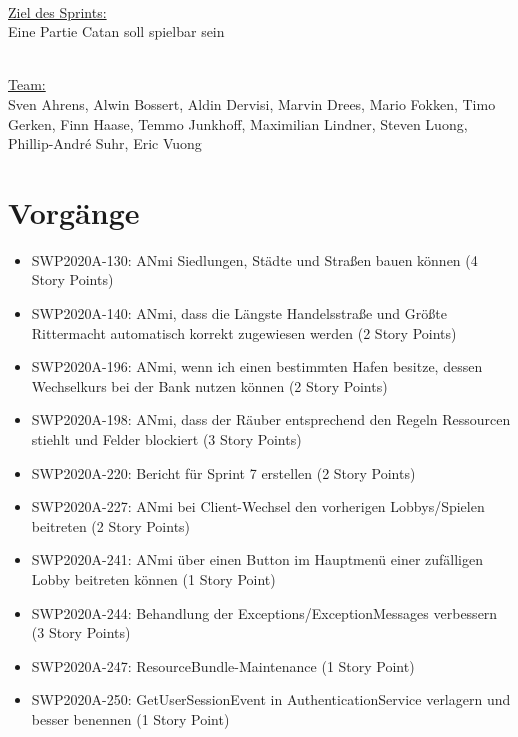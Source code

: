 \documentclass[12pt,a4paper, oneside]{article}
\begin{document}
\noindent 
\\
\underline{Ziel des Sprints:} 
\\
Eine Partie Catan soll spielbar sein

\noindent
\\
\underline {Team:} 
\\
Sven Ahrens, Alwin Bossert, Aldin Dervisi, Marvin Drees, Mario Fokken,
Timo Gerken, Finn Haase, Temmo Junkhoff, Maximilian Lindner, Steven Luong, Phillip-André Suhr, Eric Vuong


\section{Vorgänge}

\begin{itemize}

\item SWP2020A-130: ANmi Siedlungen, Städte und Straßen bauen können (4 Story Points)

\item SWP2020A-140: ANmi, dass die Längste Handelsstraße und Größte Rittermacht automatisch korrekt zugewiesen werden (2 Story Points)

\item SWP2020A-196:	ANmi, wenn ich einen bestimmten Hafen besitze, dessen Wechselkurs bei der Bank nutzen können (2 Story Points)

\item SWP2020A-198:	ANmi, dass der Räuber entsprechend den Regeln Ressourcen stiehlt und Felder blockiert (3 Story Points)

\item SWP2020A-220:	Bericht für Sprint 7 erstellen (2 Story Points)

\item SWP2020A-227:	ANmi bei Client-Wechsel den vorherigen Lobbys/Spielen beitreten (2 Story Points)

\item SWP2020A-241: ANmi über einen Button im Hauptmenü einer zufälligen Lobby beitreten können (1 Story Point)

\item SWP2020A-244: Behandlung der Exceptions/ExceptionMessages verbessern (3 Story Points)

\item SWP2020A-247: ResourceBundle-Maintenance (1 Story Point)

\item SWP2020A-250: GetUserSessionEvent in AuthenticationService verlagern und besser benennen (1 Story Point)


\end{itemize}
\end{document}
